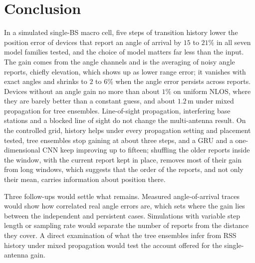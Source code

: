 \section{Conclusion}
\label{sec:conclusion}

In a simulated single-BS macro cell, five steps of transition history lower the position error of devices that report an angle of arrival by $15$ to $21\%$ in all seven model families tested, and the choice of model matters far less than the input. The gain comes from the angle channels and is the averaging of noisy angle reports, chiefly elevation, which shows up as lower range error; it vanishes with exact angles and shrinks to $2$ to $6\%$ when the angle error persists across reports. Devices without an angle gain no more than about $1\%$ on uniform NLOS, where they are barely better than a constant guess, and about $1.2\,\text{m}$ under mixed propagation for tree ensembles. Line-of-sight propagation, interfering base stations and a blocked line of sight do not change the multi-antenna result. On the controlled grid, history helps under every propagation setting and placement tested, tree ensembles stop gaining at about three steps, and a GRU and a one-dimensional CNN keep improving up to fifteen; shuffling the older reports inside the window, with the current report kept in place, removes most of their gain from long windows, which suggests that the order of the reports, and not only their mean, carries information about position there.

Three follow-ups would settle what remains. Measured angle-of-arrival traces would show how correlated real angle errors are, which sets where the gain lies between the independent and persistent cases. Simulations with variable step length or sampling rate would separate the number of reports from the distance they cover. A direct examination of what the tree ensembles infer from RSS history under mixed propagation would test the account offered for the single-antenna gain.
